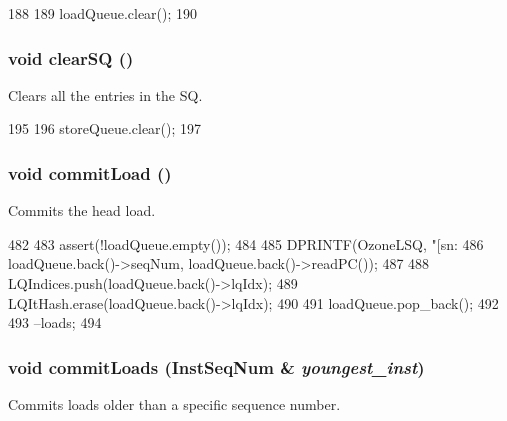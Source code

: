 \begin{DoxyCode}
188 {
189     loadQueue.clear();
190 }
\end{DoxyCode}
\hypertarget{classOzoneLWLSQ_a171cd7891063f418b1ee217f5c03537b}{
\subsubsection[{clearSQ}]{\setlength{\rightskip}{0pt plus 5cm}void clearSQ ()}}
\label{classOzoneLWLSQ_a171cd7891063f418b1ee217f5c03537b}
Clears all the entries in the SQ. 


\begin{DoxyCode}
195 {
196     storeQueue.clear();
197 }
\end{DoxyCode}
\hypertarget{classOzoneLWLSQ_a8ddd26e169a62ec5ae591a9f95934839}{
\subsubsection[{commitLoad}]{\setlength{\rightskip}{0pt plus 5cm}void commitLoad ()}}
\label{classOzoneLWLSQ_a8ddd26e169a62ec5ae591a9f95934839}
Commits the head load. 


\begin{DoxyCode}
482 {
483     assert(!loadQueue.empty());
484 
485     DPRINTF(OzoneLSQ, "[sn:%
486             loadQueue.back()->seqNum, loadQueue.back()->readPC());
487 
488     LQIndices.push(loadQueue.back()->lqIdx);
489     LQItHash.erase(loadQueue.back()->lqIdx);
490 
491     loadQueue.pop_back();
492 
493     --loads;
494 }
\end{DoxyCode}
\hypertarget{classOzoneLWLSQ_a1ae517a923a864a4e3a5aa1eeb2dd2d6}{
\subsubsection[{commitLoads}]{\setlength{\rightskip}{0pt plus 5cm}void commitLoads ({\bf InstSeqNum} \& {\em youngest\_\-inst})}}
\label{classOzoneLWLSQ_a1ae517a923a864a4e3a5aa1eeb2dd2d6}
Commits loads older than a specific sequence number. 


